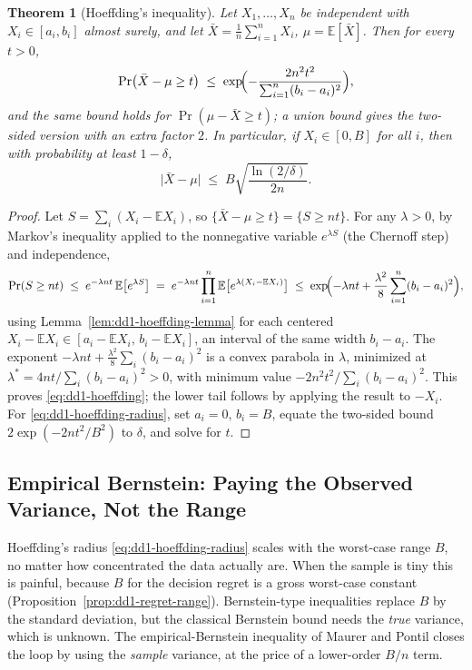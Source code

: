 \documentclass[11pt,a4paper]{article}
\theoremstyle{definition}
\theoremstyle{plain}
\newtheorem{theorem}{Theorem}[section]
\newcommand{\E}{\mathbb{E}}
\begin{document}
\begin{theorem}[Hoeffding's inequality]
\label{thm:dd1-hoeffding}
Let $X_1, \dots, X_n$ be independent with $X_i \in [a_i, b_i]$ almost surely,
and let $\bar{X} = \frac{1}{n}\sum_{i=1}^n X_i$, $\mu = \E[\bar{X}]$. Then for
every $t > 0$,
\begin{equation}
\label{eq:dd1-hoeffding}
\Pr\bigl( \bar{X} - \mu \ge t \bigr)
\;\le\; \exp\!\Bigl( - \frac{2 n^2 t^2}{\sum_{i=1}^n (b_i - a_i)^2} \Bigr),
\end{equation}
and the same bound holds for $\Pr(\mu - \bar{X} \ge t)$; a union bound gives
the two-sided version with an extra factor $2$. In particular, if
$X_i \in [0, B]$ for all $i$, then with probability at least $1 - \delta$,
\begin{equation}
\label{eq:dd1-hoeffding-radius}
\bigl| \bar{X} - \mu \bigr| \;\le\; B \sqrt{ \frac{\ln(2/\delta)}{2n} }.
\end{equation}
\end{theorem}

\begin{proof}
Let $S = \sum_i (X_i - \E X_i)$, so $\{\bar{X} - \mu \ge t\} =
\{S \ge nt\}$. For any $\lambda > 0$, by Markov's inequality applied to the
nonnegative variable $e^{\lambda S}$ (the Chernoff step) and independence,
\[
\Pr( S \ge nt ) \;\le\; e^{-\lambda n t}\, \E\bigl[ e^{\lambda S} \bigr]
\;=\; e^{-\lambda n t} \prod_{i=1}^n \E\bigl[ e^{\lambda (X_i - \E X_i)}
\bigr]
\;\le\; \exp\!\Bigl( -\lambda n t + \frac{\lambda^2}{8} \sum_{i=1}^n
(b_i - a_i)^2 \Bigr),
\]
using Lemma~\ref{lem:dd1-hoeffding-lemma} for each centered $X_i - \E X_i \in
[a_i - \E X_i,\, b_i - \E X_i]$, an interval of the same width $b_i - a_i$.
The exponent $-\lambda n t + \frac{\lambda^2}{8}\sum_i (b_i - a_i)^2$ is a
convex parabola in $\lambda$, minimized at
$\lambda^* = 4nt / \sum_i (b_i - a_i)^2 > 0$, with minimum value
$-2 n^2 t^2 / \sum_i (b_i - a_i)^2$. This proves \eqref{eq:dd1-hoeffding};
the lower tail follows by applying the result to $-X_i$. For
\eqref{eq:dd1-hoeffding-radius}, set $a_i = 0$, $b_i = B$, equate the
two-sided bound $2\exp(-2nt^2/B^2)$ to $\delta$, and solve for $t$.
\end{proof}

\subsection{Empirical Bernstein: Paying the Observed Variance, Not the Range}

Hoeffding's radius \eqref{eq:dd1-hoeffding-radius} scales with the worst-case
range $B$, no matter how concentrated the data actually are. When the sample
is tiny this is painful, because $B$ for the decision regret is a gross
worst-case constant (Proposition~\ref{prop:dd1-regret-range}). Bernstein-type
inequalities replace $B$ by the standard deviation, but the classical
Bernstein bound needs the \emph{true} variance, which is unknown. The
empirical-Bernstein inequality of Maurer and Pontil
\cite{maurer2009empirical} closes the loop by using the \emph{sample}
variance, at the price of a lower-order $B/n$ term.
\end{document}
